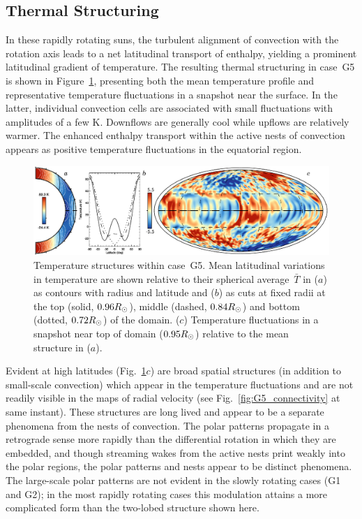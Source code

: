 \subsection{Thermal Structuring}

In these rapidly rotating suns, the turbulent alignment of convection
with the rotation axis leads to a net latitudinal transport of enthalpy, 
yielding a prominent latitudinal gradient of
temperature.  The resulting thermal structuring in case~G5 is shown in
Figure~\ref{fig:G5_thermal_structure}, presenting both the mean
temperature profile and representative temperature fluctuations in a snapshot
near the surface.  In the latter, individual convection cells are
associated with small fluctuations with amplitudes of a
few K.  Downflows are generally cool while upflows are
relatively warmer.  The enhanced enthalpy transport within the active
nests of convection appears as positive temperature fluctuations
in the equatorial region.    

\begin{figure}[!t]
  \includegraphics[width=\linewidth]{figs/chapter_3/Figure_6.eps}
  \caption[Temperature structures within case~G5]
	  {Temperature structures within case~G5.  Mean latitudinal
  variations in temperature are shown relative to their spherical
  average~$\bar{T}$ in ($a$) as contours with radius and latitude and ($b$) as
  cuts at fixed radii at the top (solid, $0.96R_\odot$), middle
  (dashed, $0.84R_\odot$) and bottom (dotted, $0.72R_\odot$)
  of the domain.  ($c$) Temperature fluctuations in a snapshot near top of
  domain ($0.95R_\odot$) relative to the mean structure in ($a$).
  \label{fig:G5_thermal_structure}}
\end{figure}


Evident at high latitudes (Fig.~\ref{fig:G5_thermal_structure}$c$) are
broad spatial structures (in addition to small-scale convection) which
appear in the temperature 
fluctuations and are not readily visible in the maps of radial
velocity (see Fig.~\ref{fig:G5_connectivity} at same instant).
These structures are long lived and appear to be a separate phenomena
from the nests of convection.  The polar patterns propagate in a
retrograde sense more rapidly than the differential rotation in which
they are embedded, and though streaming wakes from the active nests
print weakly into the polar regions, the polar patterns and nests
appear to be distinct phenomena.
The large-scale polar patterns are not evident in the slowly rotating
cases (G1 and G2); in the most rapidly rotating cases this
modulation attains a more complicated form than the two-lobed
structure shown here.


